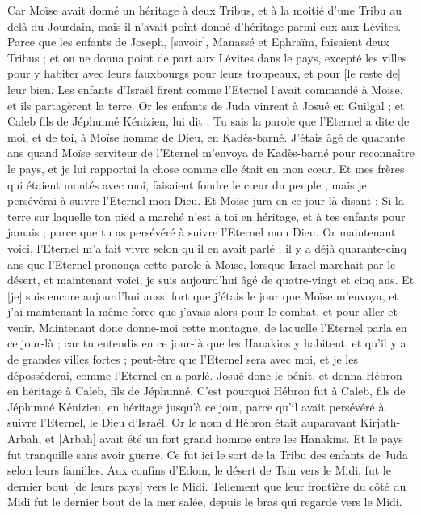 \begin{multicols}{2}
Car Moïse avait donné un héritage à deux Tribus, et à la moitié d'une Tribu au delà du Jourdain, mais il n'avait point donné d'héritage parmi eux aux Lévites.
Parce que les enfants de Joseph, [savoir], Manassé et Ephraïm, faisaient deux Tribus ; et on ne donna point de part aux Lévites dans le pays, excepté les villes pour y habiter avec leurs fauxbourgs pour leurs troupeaux, et pour [le reste de] leur bien.
Les enfants d'Israël firent comme l'Eternel l'avait commandé à Moïse, et ils partagèrent la terre.
Or les enfants de Juda vinrent à Josué en Guilgal ; et Caleb fils de Jéphunné Kénizien, lui dit : Tu sais la parole que l'Eternel a dite de moi, et de toi, à Moïse homme de Dieu, en Kadès-barné.
J'étais âgé de quarante ans quand Moïse serviteur de l'Eternel m'envoya de Kadès-barné pour reconnaître le pays, et je lui rapportai la chose comme elle était en mon cœur.
Et mes frères qui étaient montés avec moi, faisaient fondre le cœur du peuple ; mais je persévérai à suivre l'Eternel mon Dieu.
Et Moïse jura en ce jour-là disant : Si la terre sur laquelle ton pied a marché n'est à toi en héritage, et à tes enfants pour jamais ; parce que tu as persévéré à suivre l'Eternel mon Dieu.
Or maintenant voici, l'Eternel m'a fait vivre selon qu'il en avait parlé ; il y a déjà quarante-cinq ans que l'Eternel prononça cette parole à Moïse, lorsque Israël marchait par le désert, et maintenant voici, je suis aujourd'hui âgé de quatre-vingt et cinq ans.
Et [je] suis encore aujourd'hui aussi fort que j'étais le jour que Moïse m'envoya, et j'ai maintenant la même force que j'avais alors pour le combat, et pour aller et venir.
Maintenant donc donne-moi cette montagne, de laquelle l'Eternel parla en ce jour-là ; car tu entendis en ce jour-là que les Hanakins y habitent, et qu'il y a de grandes villes fortes ; peut-être que l'Eternel sera avec moi, et je les déposséderai, comme l'Eternel en a parlé.
Josué donc le bénit, et donna Hébron en héritage à Caleb, fils de Jéphunné.
C'est pourquoi Hébron fut à Caleb, fils de Jéphunné Kénizien, en héritage jusqu'à ce jour, parce qu'il avait persévéré à suivre l'Eternel, le Dieu d'Israël.
Or le nom d'Hébron était auparavant Kirjath-Arbah, et [Arbah] avait été un fort grand homme entre les Hanakins. Et le pays fut tranquille sans avoir guerre.
\VerseOne{}Ce fut ici le sort de la Tribu des enfants de Juda selon leurs familles. Aux confins d'Edom, le désert de Tsin vers le Midi, fut le dernier bout [de leurs pays] vers le Midi.
Tellement que leur frontière du côté du Midi fut le dernier bout de la mer salée, depuis le bras qui regarde vers le Midi.

\end{multicols}
